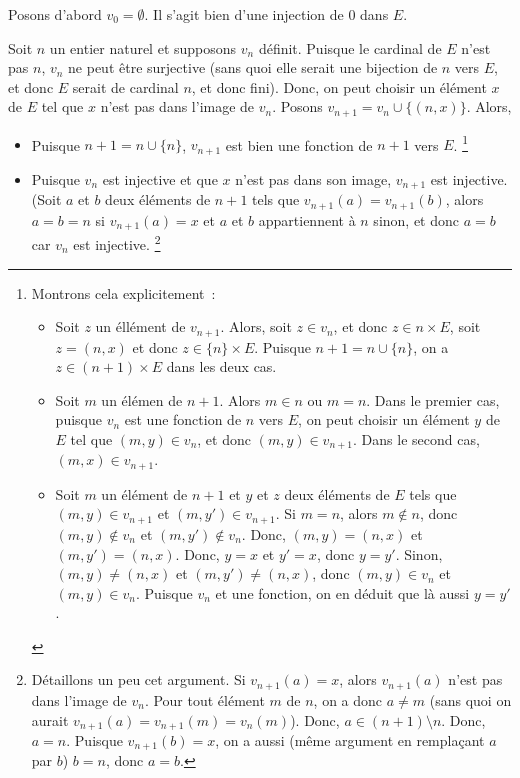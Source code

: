     Posons d'abord $v_0 = \emptyset$. 
    Il s'agit bien d'une injection de $0$ dans $E$.

    Soit $n$ un entier naturel et supposons $v_n$ définit. 
    Puisque le cardinal de $E$ n'est pas $n$, $v_n$ ne peut être surjective (sans quoi elle serait une bijection de $n$ vers $E$, et donc $E$ serait de cardinal $n$, et donc fini). 
    Donc, on peut choisir un élément $x$ de $E$ tel que $x$ n'est pas dans l'image de $v_n$. 
    Posons $v_{n+1} = v_n \cup \lbrace (n, x) \rbrace$. 
    Alors, 
    \begin{itemize}[nosep]
        \item Puisque $n+1 = n \cup \lbrace n \rbrace$, $v_{n+1}$ est bien une fonction de $n+1$ vers $E$.%
            \footnote{
                Montrons cela explicitement : 
                \begin{itemize}[nosep]
                    \item Soit $z$ un éllément de $v_{n+1}$.
                        Alors, soit $z \in v_n$, et donc $z \in n \times E$, soit $z = (n,x)$ et donc $z \in \lbrace n \rbrace \times E$.
                        Puisque $n + 1 = n \cup \lbrace n \rbrace$, on a $z \in (n+1) \times E$ dans les deux cas.
                    \item Soit $m$ un élémen de $n+1$.
                        Alors $m \in n$ ou $m = n$.
                        Dans le premier cas, puisque $v_n$ est une fonction de $n$ vers $E$, on peut choisir un élément $y$ de $E$ tel que $(m,y) \in v_n$, et donc $(m,y) \in v_{n+1}$.
                        Dans le second cas, $(m,x) \in v_{n+1}$.
                    \item Soit $m$ un élément de $n+1$ et $y$ et $z$ deux éléments de $E$ tels que $(m,y) \in v_{n+1}$ et $(m,y') \in v_{n+1}$.
                        Si $m = n$, alors $m \notin n$, donc $(m,y) \notin v_n$ et $(m,y') \notin v_n$.
                        Donc, $(m,y) = (n,x)$ et $(m,y') = (n,x)$.
                        Donc, $y = x$ et $y' = x$, donc $y = y'$.
                        Sinon, $(m,y) \neq (n,x)$ et $(m,y') \neq (n,x)$, donc $(m,y) \in v_n$ et $(m,y) \in v_n$.
                        Puisque $v_n$ et une fonction, on en déduit que là aussi $y = y'$.
                \end{itemize}
            }
        \item Puisque $v_n$ est injective et que $x$ n'est pas dans son image, $v_{n+1}$ est injective. (Soit $a$ et $b$ deux éléments de $n+1$ tels que $v_{n+1}(a) = v_{n+1}(b)$, alors $a = b = n$ si $v_{n+1}(a) = x$ et $a$ et $b$ appartiennent à $n$ sinon, et donc $a = b$ car $v_n$ est injective.%
            \footnote{Détaillons un peu cet argument.
            Si $v_{n+1}(a) = x$, alors $v_{n+1}(a)$ n'est pas dans l'image de $v_n$. 
            Pour tout élément $m$ de $n$, on a donc $a \neq m$ (sans quoi on aurait $v_{n+1}(a) = v_{n+1}(m) = v_n(m)$).
            Donc, $a \in (n+1) \setminus n$. 
            Donc, $a = n$.
            Puisque $v_{n+1}(b) = x$, on a aussi (même argument en remplaçant $a$ par $b$) $b = n$, donc $a = b$. 

}
\end{itemize}
